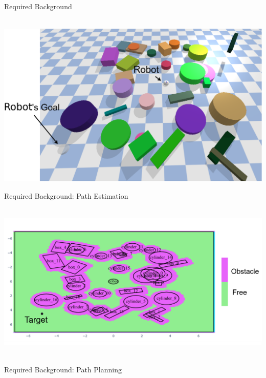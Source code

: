 \begin{frame}[fragile]{Required Background} 
  \begin{center}
    \hbox{\hspace{-1.5em} \includegraphics[height=0.85\textheight]{figures/required_background/is_there_a_path}}
  \end{center}
\end{frame}

\begin{frame}[fragile]{Required Background: Path Estimation} 
  \begin{center}
  \hbox{\hspace{0.0\textwidth} \includegraphics[width=1.0\textwidth]{figures/required_background/occupancy_grid} }
  \end{center}
\end{frame}

\begin{frame}[fragile]{Required Background: Path Planning} 
\end{frame}

